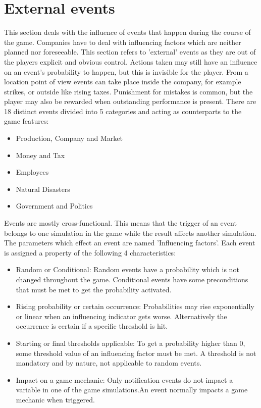 \documentclass[11pt,titlepage,oneside,openany]{book}
\begin{document}
\section{External events}
This section deals with the influence of events that happen during the course of the game. Companies have to deal with influencing factors which are neither planned nor foreseeable\cite{Campbell}. This section refers to 'external' events as they are out of the players explicit and obvious control. Actions taken may still have an influence on an event's probability to happen, but this is invisible for the player. From a location point of view events can take place inside the company, for example strikes, or outside like rising taxes. Punishment for mistakes is common, but the player may also be rewarded when outstanding performance is present. There are 18 distinct events divided into 5 categories and acting as counterparts to the game features:
\begin{itemize}
\item Production, Company and Market
\item Money and Tax
\item Employees
\item Natural Disasters
\item Government and Politics
\end{itemize}

Events are mostly cross-functional. This means that the trigger of an event belongs to one simulation in the game while the result affects another simulation. The parameters which effect an event are named 'Influencing factors'. Each event is assigned a property of the following 4 characteristics:

\begin{itemize}
\item Random or Conditional: Random events have a probability which is not changed throughout the game. Conditional events have some preconditions that must be met to get the probability activated.
\item Rising probability or certain occurrence: Probabilities may rise exponentially or linear when an influencing indicator gets worse. Alternatively the occurrence is certain if a specific threshold is hit.
\item Starting or final thresholds applicable: To get a probability higher than 0, some threshold value of an influencing factor must be met. A threshold is not mandatory and by nature, not applicable to random events.
\item Impact on a game mechanic: Only notification events do not impact a variable in one of the game simulations.An event normally impacts a game mechanic when triggered.
\end{itemize}
\end{document}
